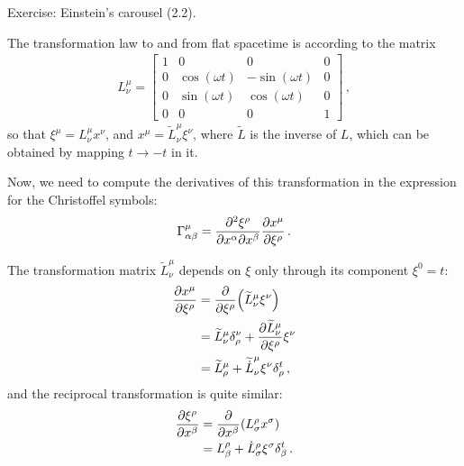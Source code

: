 \documentclass[main.tex]{subfiles}
\begin{document}
\begin{extracontent}
Exercise: Einstein's carousel (2.2). 

The transformation law to and from flat spacetime is according to the matrix
%
\begin{align}
L^{\mu }_{\nu }= \left[\begin{array}{cccc}
1 & 0 & 0 & 0 \\ 
0 & \cos ( \omega t)  & - \sin ( \omega t)  & 0 \\ 
0 & \sin ( \omega t)  & \cos ( \omega t)  & 0 \\ 
0 & 0 & 0 & 1
\end{array}\right]
\,,
\end{align}
%
so that \(\xi^{\mu } = L^{\mu }_{\nu } x^{\nu }\), and \(x^{\mu } = \widetilde{L}^{\mu }_{\nu } \xi^{\nu }\), where \(\widetilde{L}\) is the inverse of \(L\), which can be obtained by mapping \(t \to -t\) in it. 

Now, we need to compute the derivatives of this transformation in the expression for the Christoffel symbols: 
%
\begin{align}
\Gamma^{\mu }_{\alpha \beta } = \pdv{\xi^{\rho }}{x^{\alpha }}{x^{\beta }} \pdv{x^{\mu }}{\xi^{\rho }}
\,.
\end{align}

The transformation matrix \(\widetilde{L}^{\mu }_{\nu }\) depends on \(\xi \) only through its component \(\xi^{0} = t\):
%
\begin{align}
\pdv{x^{\mu }}{\xi^{\rho }} &= \pdv{}{\xi^{\rho }} \qty(\widetilde{L}^{\mu }_{\nu } \xi^{\nu })  \\
&= \widetilde{L}^{\mu }_{\nu } \delta^{\nu }_{\rho } + \pdv{\widetilde{L}^{\mu }_{\nu }}{\xi^{\rho }} \xi^{\nu }  \\
&= \widetilde{L}^{\mu }_{\rho } + \widetilde{\dot{L}}^{\mu }_{\nu } \xi^{\nu } \delta^{t}_{\rho }
\,,
\end{align}
%
and the reciprocal transformation is quite similar: 
%
\begin{align}
\pdv{\xi^{\rho }}{x^{\beta }} &= \pdv{}{x^{\beta }} \qty(L^{\rho }_{\sigma } x^{\sigma })  \\
&= L^{\rho }_{\beta } + \dot{L}^{\rho }_{\sigma  } \xi^{\sigma } \delta^{t}_{\beta }
\,.
\end{align}


\end{extracontent}
\end{document}
